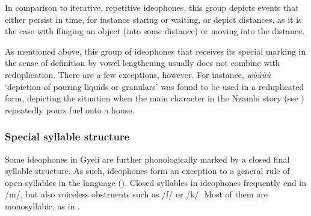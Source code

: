 
In comparison to iterative, repetitive ideophones, this group depicts events that either persist in time, for instance staring or waiting, or depict distances, as it is the case with flinging an object (into some distance) or moving into the distance.

As mentioned above, this group of ideophones that receives its special marking in the sense of  definition by vowel lengthening usually does not combine with reduplication. There are a few exceptions, however. For instance, {\itshape wùùùù} `depiction of pouring liquids or granulars' was found to be used in a reduplicated form, depicting the situation when the main character in the Nzambi story (see ) repeatedly pours fuel onto a house. 


\subsubsection*{Special syllable structure} Some ideophones in Gyeli are further phonologically marked by a closed final syllable structure. As such, ideophones form an exception to a general rule of open syllables in the language ().
Closed syllables in ideophones frequently end in /m/, but also voiceless obstruents such as /f/ or /k/. Most of them are monosyllabic, as in .



